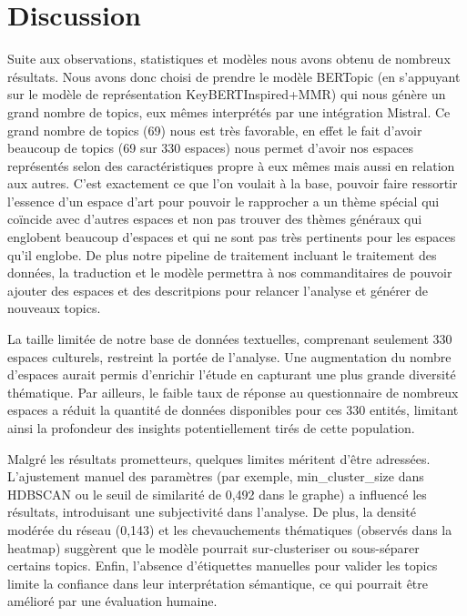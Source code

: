 \documentclass[mstat,12pt]{unswthesis}
\begin{document}
\hypertarget{discussion}{%
\chapter{Discussion}\label{discussion}}

Suite aux observations, statistiques et modèles nous avons obtenu de nombreux résultats. Nous avons donc choisi de prendre le modèle BERTopic (en s'appuyant sur le modèle de représentation KeyBERTInspired+MMR) qui nous génère un grand nombre de topics, eux mêmes interprétés par une intégration Mistral. Ce grand nombre de topics (69) nous est très favorable, en effet le fait d'avoir beaucoup de topics (69 sur 330 espaces) nous permet d'avoir nos espaces représentés selon des caractéristiques propre à eux mêmes mais aussi en relation aux autres. C'est exactement ce que l'on voulait à la base, pouvoir faire ressortir l'essence d'un espace d'art pour pouvoir le rapprocher a un thème spécial qui coïncide avec d'autres espaces et non pas trouver des thèmes généraux qui englobent beaucoup d'espaces et qui ne sont pas très pertinents pour les espaces qu'il englobe. De plus notre pipeline de traitement incluant le traitement des données, la traduction et le modèle permettra à nos commanditaires de pouvoir ajouter des espaces et des descritpions pour relancer l'analyse et générer de nouveaux topics.

\bigskip

La taille limitée de notre base de données textuelles, comprenant seulement 330 espaces culturels, restreint la portée de l’analyse. Une augmentation du nombre d’espaces aurait permis d’enrichir l’étude en capturant une plus grande diversité thématique. Par ailleurs, le faible taux de réponse au questionnaire de nombreux espaces a réduit la quantité de données disponibles pour ces 330 entités, limitant ainsi la profondeur des insights potentiellement tirés de cette population.

Malgré les résultats prometteurs, quelques limites méritent d’être adressées. L’ajustement manuel des paramètres (par exemple, min\_cluster\_size dans HDBSCAN ou le seuil de similarité de 0,492 dans le graphe) a influencé les résultats, introduisant une subjectivité dans l’analyse. De plus, la densité modérée du réseau (0,143) et les chevauchements thématiques (observés dans la heatmap) suggèrent que le modèle pourrait sur-clusteriser ou sous-séparer certains topics. Enfin, l’absence d’étiquettes manuelles pour valider les topics limite la confiance dans leur interprétation sémantique, ce qui pourrait être amélioré par une évaluation humaine.
\end{document}

